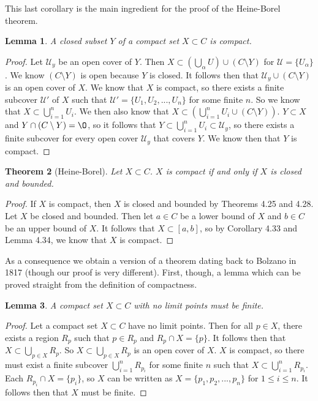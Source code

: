 \documentclass[12pt]{article}
\renewcommand{\emptyset}{\O}
\renewcommand{\_}[1]{\underline{ #1 }}
\newtheorem{theorem}{Theorem}[section]
\newtheorem{lemma}[theorem]{Lemma}
\theoremstyle{definition}
\numberwithin{equation}{subsection}
\begin{document}
This last corollary is the main ingredient for the proof of the Heine-Borel theorem.

\begin{lemma}
A closed subset $Y$ of a compact set $X \subset C$ is compact.
\end{lemma}

\begin{proof}
Let $\mathcal{U}_y$ be an open cover of $Y$. Then $X \subset (\bigcup_{\alpha}U) \cup (C \setminus Y)$ for $\mathcal{U} = \{U_{\alpha}\}$. We know $(C \setminus Y)$ is open because $Y$ is closed. It follows then that $\mathcal{U}_y \cup (C\setminus Y)$ is an open cover of $X$. We know that $X$ is compact, so there exists a finite subcover $\mathcal{U'}$ of $X$ such that $\mathcal{U'} = \{U_1, U_2,..., U_n\}$ for some finite $n$. So we know that $X \subset \bigcup_{i = 1}^nU_i$. We then also know that $X \subset(\bigcup_{i = 1}^nU_i \cup (C \setminus Y))$. $Y \subset X$ and $Y \cap (C \setminus Y) = \emptyset$, so it follows that $Y \subset \bigcup_{i = 1}^nU_i \subset \mathcal{U}_y$, so there exists a finite subcover for every open cover $\mathcal{U}_y$ that covers $Y$. We know then that $Y$ is compact.
\end{proof}

\begin{theorem}[Heine-Borel]  Let $X \subset C$.  $X$ is compact if and only if $X$ is closed and bounded.
\end{theorem}

\begin{proof}
If $X$ is compact, then $X$ is closed and bounded by Theorems 4.25 and 4.28.
Let $X$ be closed and bounded. Then let $a \in C$ be a lower bound of $X$ and $b \in C$ be an upper bound of $X$. It follows that $X \subset [a,b]$, so by Corollary 4.33 and Lemma 4.34, we know that $X$ is compact.
\end{proof}

As a consequence we obtain a version of a theorem dating back to Bolzano in 1817 (though our proof is very different).  First, though, a lemma which can be proved straight from the definition of compactness.

\begin{lemma}
A compact set $X \subset C$ with no limit points must be finite.
\end{lemma}

\begin{proof}
Let a compact set $X \subset C$ have no limit points. Then for all $p \in X$, there exists a region $R_p$ such that $p \in R_p$ and $R_p \cap X = \{p\}$. It follows then that $X \subset \bigcup_{p \in X} R_p$. So $X \subset \bigcup_{p \in X} R_p$ is an open cover of $X$. $X$ is compact, so there must exist a finite subcover $\bigcup_{i = 1}^n R_{p_i}$ for some finite $n$ such that $X \subset \bigcup_{i = 1}^n R_{p_i}$. Each $R_{p_i} \cap X = \{p_i\}$, so $X$ can be written as $X = \{p_1, p_2,..., p_n\}$ for $1 \leq i \leq n$. It follows then that $X$ must be finite.
\end{proof}
\end{document}

